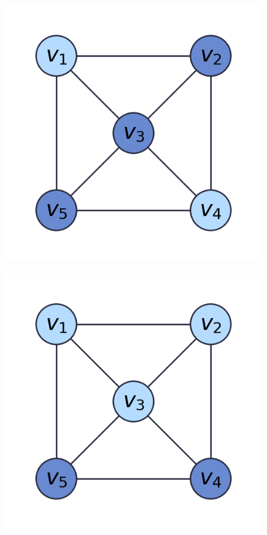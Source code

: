 \documentclass[12pt]{amsart}
\theoremstyle{plain}
\begin{document}
\begin{figure}[h!]
  \centering
  \begin{minipage}{0.42\textwidth}
    \centering
    \includegraphics[width=\textwidth]{../figures/res_set_fig1.png}
    \label{fig:res_set_fig1}
  \end{minipage}
  \hspace{0.08\textwidth}
  \begin{minipage}{0.42\textwidth}
    \centering
    \includegraphics[width=\textwidth]{../figures/res_set_fig2.png}
    \label{fig:res_set_fig2}
  \end{minipage}
\end{figure}
\end{document}
